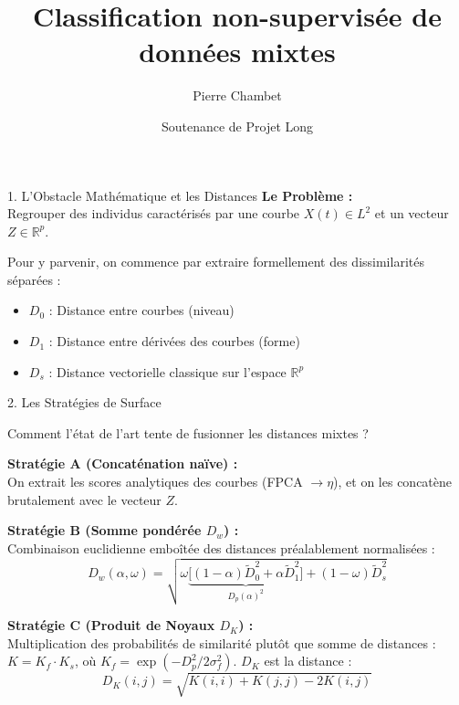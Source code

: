 \documentclass[10pt, compress]{beamer}
\newcommand{\Ltwo}{L^2}
\newcommand{\Dw}{D_w}
\begin{document}
\begin{frame}
  \title{Classification non-supervisée de données mixtes}
  \author{Pierre Chambet}
  \date{Soutenance de Projet Long}
  \titlepage
\end{frame}

\begin{frame}{1. L'Obstacle Mathématique et les Distances}
\textbf{Le Problème :}\\
Regrouper des individus caractérisés par une courbe $X(t) \in \Ltwo$ et un vecteur $Z \in \mathbb{R}^p$.

\vspace{1em}
Pour y parvenir, on commence par extraire formellement des dissimilarités séparées :
\begin{itemize}
    \item $D_0$ : Distance entre courbes (niveau)
    \item $D_1$ : Distance entre dérivées des courbes (forme)
    \item $D_s$ : Distance vectorielle classique sur l'espace $\mathbb{R}^p$
\end{itemize}
\end{frame}

\begin{frame}{2. Les Stratégies de Surface}

Comment l'état de l'art tente de fusionner les distances mixtes ?

\vspace{1em}
\textbf{Stratégie A (Concaténation naïve) :} \\
On extrait les scores analytiques des courbes (FPCA $\rightarrow \eta$), et on les concatène brutalement avec le vecteur $Z$. 

\vspace{1em}
\textbf{Stratégie B (Somme pondérée $D_w$) :} \\
Combinaison euclidienne emboîtée des distances préalablement normalisées :
$$ \Dw(\alpha,\omega) = \sqrt{\omega \underbrace{\bigl[(1-\alpha)\tilde{D}_0^2 + \alpha\tilde{D}_1^2\bigr]}_{D_p(\alpha)^2} + (1-\omega)\tilde{D}_s^2} $$

\vspace{1em}
\textbf{Stratégie C (Produit de Noyaux $D_K$) :} \\
Multiplication des probabilités de similarité plutôt que somme de distances :\\
$K = K_f \cdot K_s$, où $K_f = \exp(-D_p^2 / 2\sigma_f^2)$.
$D_K$ est la distance :
$$D_K(i,j) = \sqrt{K(i,i) + K(j,j) - 2K(i,j)}$$
\end{frame}
\end{document}
